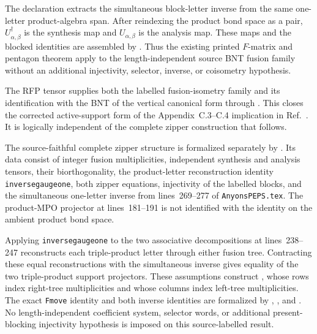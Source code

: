 \documentclass{article}
\begin{document}
The declaration
 extracts the
simultaneous block-letter inverse from the same one-letter product-algebra
span. After reindexing the product bond space as a pair,
$U_{\alpha,\beta}^\dagger$ is the synthesis map and $U_{\alpha,\beta}$ is the
analysis map. These maps and the blocked identities are assembled by
.
Thus the existing printed $F$-matrix and pentagon theorem apply to the
length-independent source BNT fusion family without an additional
injectivity, selector, inverse, or coisometry hypothesis.

The RFP tensor supplies both the labelled fusion-isometry family and its
identification with the BNT of the vertical canonical form through
. This closes the
corrected active-support form of the Appendix~C.3--C.4 implication in
Ref.~\cite{Cirac2016MPDO_arXiv}. It is logically independent of the complete
zipper construction that follows.

The source-faithful complete zipper structure is formalized separately by
. Its data consist of integer
fusion multiplicities, independent synthesis and analysis tensors, their
biorthogonality, the product-letter reconstruction identity
\texttt{inversegaugeone}, both zipper equations, injectivity of the labelled
blocks, and the simultaneous one-letter inverse from lines~269--277 of
\texttt{AnyonsPEPS.tex}. The product-MPO projector at lines~181--191 is not
identified with the identity on the ambient product bond space.

Applying \texttt{inversegaugeone} to the two associative decompositions at
lines~238--247 reconstructs each triple-product letter through either fusion
tree. Contracting these equal reconstructions with the simultaneous inverse
gives equality of the two triple-product support projectors. These assumptions
construct
, whose rows index
right-tree multiplicities and whose columns index left-tree multiplicities.
The exact \texttt{Fmove} identity and both inverse identities are formalized
by
,
,
and
.
No length-independent coefficient system, selector words, or additional
present-blocking injectivity hypothesis is imposed on this source-labelled
result.
\end{document}

